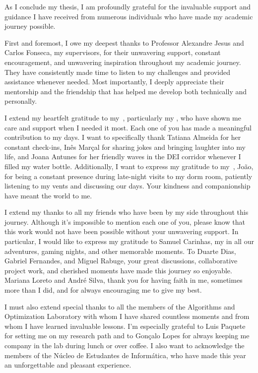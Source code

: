 \begin{acknowledgments}

  As I conclude my thesis, I am profoundly grateful for the invaluable support and
  guidance I have received from numerous individuals who have made my academic
  journey possible.

  First and foremost, I owe my deepest thanks to Professor Alexandre Jesus and
  Carlos Fonseca, my supervisors, for their unwavering support, constant
  encouragement, and unwavering inspiration throughout my academic journey. They
  have consistently made time to listen to my challenges and provided assistance
  whenever needed. Most importantly, I deeply appreciate their mentorship and the
  friendship that has helped me develop both technically and personally.

  I extend my heartfelt gratitude to my~, particularly my
  , who have shown me care and support when I needed it most. Each
  one of you has made a meaningful contribution to my days. I want to specifically
  thank Tatiana Almeida for her constant check-ins, Inês Marçal for sharing jokes
  and bringing laughter into my life, and Joana Antunes for her friendly waves in
  the DEI corridor whenever I filled my water bottle. Additionally, I want to
  express my gratitude to my~, João, for being a constant presence
  during late-night visits to my dorm room, patiently listening to my vents and
  discussing our days. Your kindness and companionship have meant the world to me.

  I extend my thanks to all my friends who have been by my side throughout this
  journey. Although it's impossible to mention each one of you, please know that
  this work would not have been possible without your unwavering support. In
  particular, I would like to express my gratitude to Samuel Carinhas, my
   in all our adventures, gaming nights, and other memorable moments. To Duarte
  Dias, Gabriel Fernandes, and Miguel Rabuge, your great discussions,
  collaborative project work, and cherished moments have made this journey so
  enjoyable. Mariana Loreto and André Silva, thank you for having faith in me,
  sometimes more than I did, and for always encouraging me to give my best.

  I must also extend special thanks to all the members of the Algorithms and
  Optimization Laboratory with whom I have shared countless moments and from whom
  I have learned invaluable lessons. I'm especially grateful to Luis Paquete for
  setting me on my research path and to Gonçalo Lopes for always keeping me
  company in the lab during lunch or over coffee. I also want to acknowledge the
  members of the Núcleo de Estudantes de Informática, who have made this year an
  unforgettable and pleasant experience.


\end{acknowledgments}
